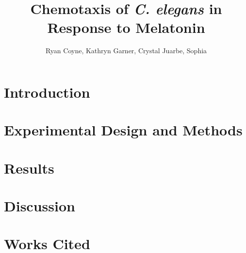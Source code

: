 \documentclass[11pt]{article}
\begin{document}
    \title{Chemotaxis of \emph{C. elegans} in Response to Melatonin}
    \author{Ryan Coyne, Kathryn Garner, Crystal Juarbe, Sophia}
    \maketitle

    \section*{Introduction}

    \section*{Experimental Design and Methods}

    \section*{Results}

    \section*{Discussion}

    \section*{Works Cited}
        
\end{document}
